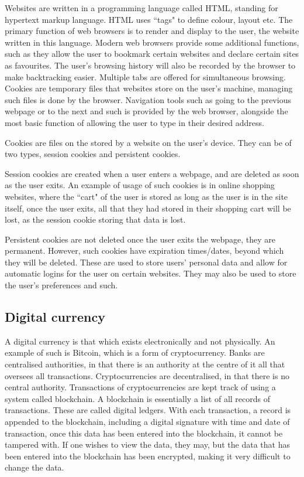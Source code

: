 Websites are written in a programming language called HTML, standing for hypertext markup language.
HTML uses ``tags" to define colour, layout etc.
The primary function of web browsers is to render and display to the user, the website written
in this language. Modern web browsers provide some additional functions, such as they allow the
user to bookmark certain websites and declare certain sites as favourites. The user's browsing
history will also be recorded by the browser to make backtracking easier. Multiple tabs are offered
for simultaneous browsing. Cookies are temporary files that websites store on the user's machine,
managing such files is done by the browser. Navigation tools such as going to the previous webpage
or to the next and such is provided by the web browser, alongside the most basic function of 
allowing the user to type in their desired address.

Cookies are files on the stored by a website on the user's device. They can be of two types,
session cookies and persistent cookies.

Session cookies are created when a user enters a webpage, and are deleted as soon as the user 
exits. An example of usage of such cookies is in online shopping websites, where the ``cart" of
the user is stored as long as the user is in the site itself, once the user exits, all that they
had stored in their shopping cart will be lost, as the session cookie storing that data is lost.

Persistent cookies are not deleted once the user exits the webpage, they are permanent. However,
such cookies have expiration times/dates, beyond which they will be deleted. These are used to
store users' personal data and allow for automatic logins for the user on certain websites. They
may also be used to store the user's preferences and such.

\subsection{Digital currency}

A digital currency is that which exists electronically and not physically. An example of such is
Bitcoin, which is a form of cryptocurrency. Banks are centralised authorities, in that there is
an authority at the centre of it all that oversees all transactions. Cryptocurrencies are 
decentralised, in that there is no central authority. Transactions of cryptocurrencies are kept
track of using a system called blockchain. A blockchain is essentially a list of all records
of transactions. These are called digital ledgers. With each transaction, a record is appended
to the blockchain, including a digital signature with time and date of transaction, once this
data has been entered into the blockchain, it cannot be tampered with. If one wishes to view
the data, they may, but the data that has been entered into the blockchain has been encrypted,
making it very difficult to change the data.

